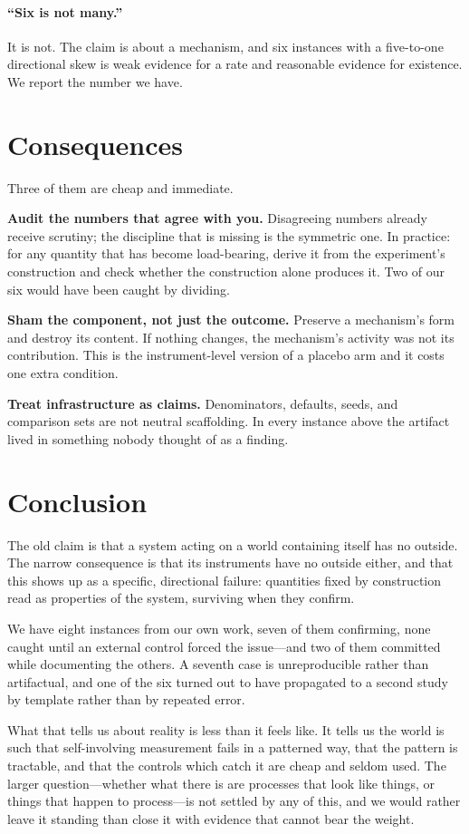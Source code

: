\documentclass[11pt]{article}
\begin{document}
\paragraph{``Six is not many.''} It is not. The claim is about a mechanism, and
six instances with a five-to-one directional skew is weak evidence for a rate
and reasonable evidence for existence. We report the number we have.

\section{Consequences}

Three of them are cheap and immediate.

\textbf{Audit the numbers that agree with you.} Disagreeing numbers already
receive scrutiny; the discipline that is missing is the symmetric one. In
practice: for any quantity that has become load-bearing, derive it from the
experiment's construction and check whether the construction alone produces it.
Two of our six would have been caught by dividing.

\textbf{Sham the component, not just the outcome.} Preserve a mechanism's form
and destroy its content. If nothing changes, the mechanism's activity was not
its contribution. This is the instrument-level version of a placebo arm and it
costs one extra condition.

\textbf{Treat infrastructure as claims.} Denominators, defaults, seeds, and
comparison sets are not neutral scaffolding. In every instance above the
artifact lived in something nobody thought of as a finding.

\section{Conclusion}

The old claim is that a system acting on a world containing itself has no
outside. The narrow consequence is that its instruments have no outside either,
and that this shows up as a specific, directional failure: quantities fixed by
construction read as properties of the system, surviving when they confirm.

We have eight instances from our own work, seven of them confirming, none caught
until an external control forced the issue---and two of them committed while
documenting the others. A seventh case is unreproducible rather than
artifactual, and one of the six turned out to have propagated to a second study
by template rather than by repeated error.

What that tells us about reality is less than it feels like. It tells us the
world is such that self-involving measurement fails in a patterned way, that
the pattern is tractable, and that the controls which catch it are cheap and
seldom used. The larger question---whether what there is are processes that
look like things, or things that happen to process---is not settled by any of
this, and we would rather leave it standing than close it with evidence that
cannot bear the weight.
\end{document}
